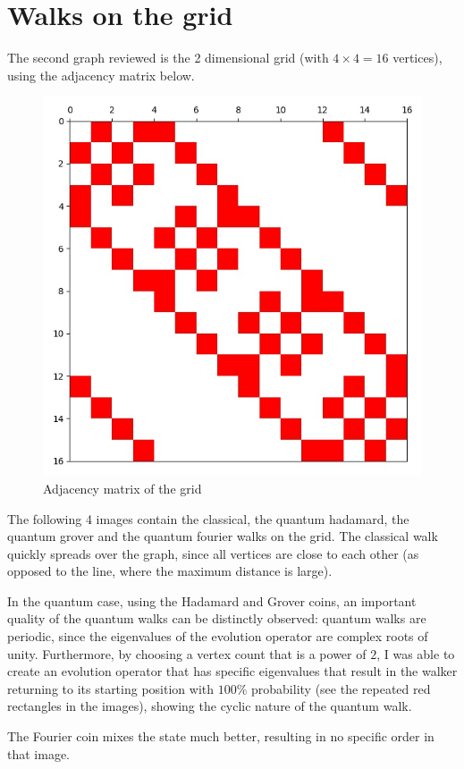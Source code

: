 \section{Walks on the grid}

The second graph reviewed is the 2 dimensional grid (with $4\times{}4=16$ vertices), using the adjacency matrix below.

\begin{figure}[H]
\centering
\includegraphics[width=0.5\linewidth]{./figures/results/grid/graph.jpg}
\caption{Adjacency matrix of the grid}
\end{figure}

The following 4 images contain the classical, the quantum hadamard, the quantum grover and the quantum fourier walks on the grid. The classical walk quickly spreads over the graph, since all vertices are close to each other (as opposed to the line, where the maximum distance is large).

In the quantum case, using the Hadamard and Grover coins, an important quality of the quantum walks can be distinctly observed: quantum walks are periodic, since the eigenvalues of the evolution operator are complex roots of unity. Furthermore, by choosing a vertex count that is a power of $2$, I was able to create an evolution operator that has specific eigenvalues that result in the walker returning to its starting position
with $100\%$ probability (see the repeated red rectangles in the images), showing the cyclic nature of the quantum walk.

The Fourier coin mixes the state much better, resulting in no specific order in that image.

